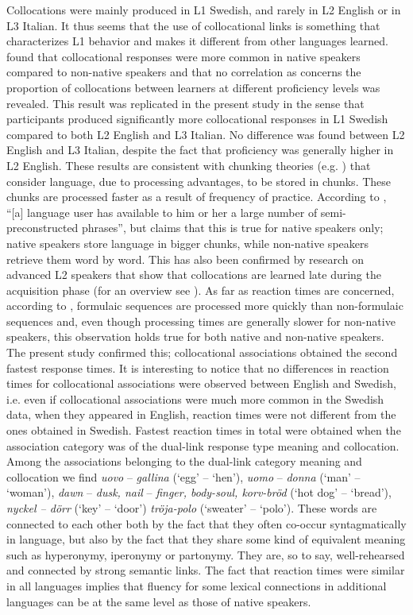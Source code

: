 \documentclass[output=paper,colorlinks,citecolor=brown,nonflat]{langsci/langscibook}
\begin{document}
Collocations were mainly produced in L1 Swedish,\largerpage
and rarely in L2 English or in L3 Italian. It thus seems that the use of collocational links is something that characterizes L1 behavior and makes it different from other languages learned. \citet{Fitzpatrick2006} found that collocational responses were more common in native speakers compared to non-native speakers and that no correlation as concerns the proportion of collocations between learners at different proficiency levels was revealed. This result was replicated in the present study in the sense that participants produced significantly more collocational responses in L1 Swedish compared to both L2 English and L3 Italian. No difference was found between L2 English and L3 Italian, despite the fact that proficiency was generally higher in L2 English. These results are consistent with chunking theories (e.g. \citealt{EllisN1996, Wray2002}) that consider language, due to processing advantages, to be stored in chunks. These chunks are processed faster as a result of frequency of practice. According to \citet[110]{Sinclair1991}, “[a] language user has available to him or her a large number of semi-preconstructed phrases”, but \citet{Wray2002} claims that this is true for native speakers only; native speakers store language in bigger chunks, while non-native speakers retrieve them word by word. This has also been confirmed by research on advanced L2 speakers that show that collocations are learned late during the acquisition phase (for an overview see \citealt{ErmanEtAl2016}). As far as reaction times are concerned, according to \citet[141]{ErmanEtAl2016}, formulaic sequences are processed more quickly than non-formulaic sequences and, even though processing times are generally slower for non-native speakers, this observation holds true for both native and non-native speakers. The present study confirmed this; collocational associations obtained the second fastest response times. It is interesting to notice that no differences in reaction times for collocational associations were observed between English and Swedish, i.e. even if collocational associations were much more common in the Swedish data, when they appeared in English, reaction times were not different from the ones obtained in Swedish. Fastest reaction times in total were obtained when the association category was of the dual-link response type meaning and collocation. Among the associations belonging to the dual-link category meaning and collocation we find \textit{uovo} -- \textit{gallina} (‘egg’ -- ‘hen’), \textit{uomo} -- \textit{donna} (‘man’ -- ‘woman’), \textit{dawn} -- \textit{dusk, nail} -- \textit{finger, body-soul, korv-bröd} (‘hot dog’ -- ‘bread’), \textit{nyckel – dörr} (‘key’ -- ‘door’) \textit{tröja-polo} (‘sweater’ -- ‘polo’). These words are connected to each other both by the fact that they often co-occur syntagmatically in language, but also by the fact that they share some kind of equivalent meaning such as hyperonymy, iperonymy or partonymy. They are, so to say, well-rehearsed and connected by strong semantic links. The fact that reaction times were similar in all languages implies that fluency for some lexical connections in additional languages can be at the same level as those of native speakers.
\end{document}
